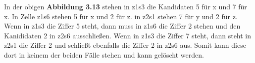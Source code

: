 In der obigen \textbf{Abbildung 3.13} stehen in z1s3 die Kandidaten 5 für x und 7 für x. In Zelle z1s6 stehen 5 für x und 2 für z. in z2s1 stehen 7 für y und 2 für z. Wenn in z1s3 die Ziffer 5 steht, dann muss in z1s6 die Ziffer 2 stehen und den Kanididaten 2 in z2s6 ausschließen. Wenn in z1s3 die Ziffer 7 steht, dann steht in z2s1 die Ziffer 2 und schließt ebenfalls die Ziffer 2 in z2s6 aus. Somit kann diese dort in keinem der beiden Fälle stehen und kann gelöscht werden.